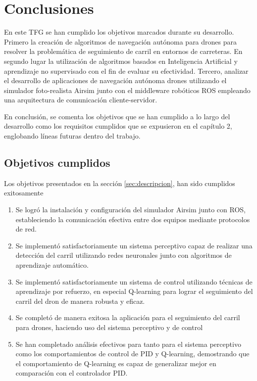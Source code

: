 \chapter{Conclusiones}
\label{cap:capitulo5}

En este TFG se han cumplido los objetivos marcados durante su desarrollo. Primero la creación de algoritmos de
navegación autónoma para drones para resolver la problemática de seguimiento de carril en entornos de carreteras. 
En segundo lugar la utilización de algoritmos basados en Inteligencia Artificial y aprendizaje no supervisado
con el fin de evaluar su efectividad. Tercero, analizar el desarrollo de aplicaciones de navegación autónoma drones
utilizando el simulador foto-realista Airsim junto con el middleware robóticos ROS empleando una arquitectura de
comunicación cliente-servidor. 

En conclusión, se comenta los objetivos que se han cumplido a lo largo del desarrollo como los requisitos cumplidos
que se expusieron en el capítulo 2, englobando líneas futuras dentro del trabajo. 

\section{Objetivos cumplidos}
\label{objetivos_cumplidos}

Los objetivos presentados en la sección \ref{sec:descripcion}, han sido cumplidos exitosamente 
\begin{enumerate}
    \item Se logró la instalación y configuración del simulador Airsim junto con ROS, estableciendo la comunicación efectiva
    entre dos equipos mediante protocolos de red. 
    \item Se implementó satisfactoriamente un sistema perceptivo capaz de realizar una detección del carril utilizando 
    redes neuronales junto con algoritmos de aprendizaje automático.
    \item Se implementó satisfactoriamente un sistema de control utilizando técnicas de aprendizaje por refuerzo, en especial Q-learning 
    para lograr el seguimiento del carril del dron de manera robusta y eficaz.
    \item Se completó de manera exitosa la aplicación para el seguimiento del carril para drones, haciendo uso del sistema perceptivo y de control
    \item Se han completado análisis efectivos para tanto para el sistema perceptivo como los comportamientos de control de PID y Q-learning, demostrando que el comportamiento
    de Q-learning es capaz de generalizar mejor en comparación con el controlador PID.
\end{enumerate}

